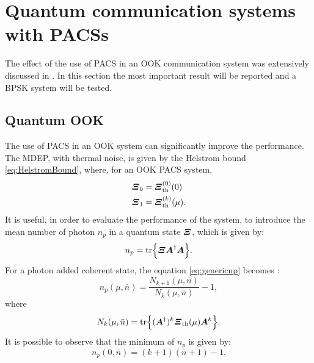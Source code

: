 \section{Quantum communication systems with PACSs}
    The effect of the use of PACS in an OOK communication system was extensively discussed in
    \cite{PACSDisc}. In this section the most important result will be reported and a BPSK
    system will be tested.

    \subsection{Quantum OOK}
    The use of PACS in an OOK system can significantly improve the performance. The MDEP, with
    thermal noise, is given by the Helstrom bound \ref{eq:HelstromBound}, where, for an OOK PACS
    system,
    \begin{subequations}
        \begin{align}
        \bm{\relax{\varXi}}_0 &=  \bm{\relax{\varXi}}_{\mathrm{th}}^{(0)}(0)\\
        \bm{\relax{\varXi}}_1 &=  \bm{\relax{\varXi}}_{\mathrm{th}}^{(k)}(\mu).
        \end{align}
    \end{subequations}
    It is useful, in order to evaluate the performance of the system, to introduce the mean number
    of photon $n_p$ in a quantum state $\bm{\relax{\varXi}}$, which is given by:
    \begin{equation}
        n_p = \tr{\bm{\relax{\varXi}}\bm{\relax{A}}^\dagger\bm{\relax{A}}}.
        \label{eq:genericnp}
    \end{equation}
    For a photon added coherent state, the equation \ref{eq:genericnp} becomes \cite{PACSDisc}:
    \begin{equation}
        n_p(\mu,\bar{n}) = \frac{N_{k+1}(\mu,\bar{n})}{N_k(\mu,\bar{n})}-1,
        \label{eq:np}
    \end{equation}
    where
    \begin{equation}
        N_k(\mu,\bar{n}) = \tr{(\bm{\relax{A}}^\dagger)^k \bm{\relax{\varXi}}_{\mathrm{th}}(\mu) \bm{\relax{A}}^k}.
    \end{equation}
    It is possible to observe that the minimum of $n_p$ is given by:
    \begin{equation}
        n_p(0,\bar{n}) = (k+1)(\bar{n}+1)-1.
        \label{eq:min_np}
    \end{equation}

